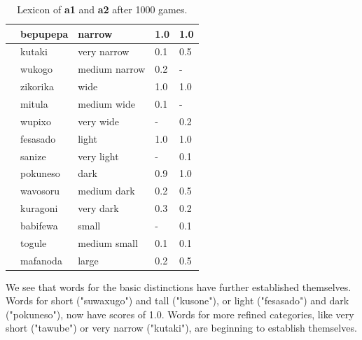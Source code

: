 \begin{table}
\begin{center}
\begin{tabular}{ l  l  l  l  l }
\lsptoprule
[WIDTH 0.0-0.5]&bepupepa&narrow & 1.0&1.0\\ \midrule
 [WIDTH 0.0-0.25]&kutaki&very narrow & 0.1&0.5\\ \midrule
 [WIDTH 0.25-0.5]&wukogo&medium narrow & 0.2&-\\ \midrule
[WIDTH 0.5-1.0]&zikorika&wide & 1.0&1.0\\ \midrule
 [WIDTH 0.5-0.75]&mitula&medium wide &0.1&-\\ \midrule
 [WIDTH 0.75-1.0]&wupixo&very wide & -&0.2\\ \midrule
[GRAY 0.0-0.5]&fesasado&light & 1.0&1.0\\ \midrule
 [GRAY 0.0-0.25]&sanize&very light & -&0.1\\ \midrule
[GRAY 0.5-1.0]&pokuneso&dark &0.9&1.0\\ \midrule
 [GRAY 0.5-0.75]&wavosoru&medium dark & 0.2&0.5\\ \midrule
 [GRAY 0.75-1.0]&kuragoni&very dark &0.3&0.2\\ \midrule
[AREA 0.0-0.5]&babifewa&small & -&0.1\\ \midrule
 [AREA 0.25-0.5]&togule&medium small & 0.1&0.1\\ \midrule
[AREA 0.5-1.0]&mafanoda&large & 0.2&0.5\\ \midrule
\end{tabular}
\caption{\label{tab:lex500b} Lexicon of {\bf a1} and {\bf a2} after 1000 games.}
\end{center}
\end{table}

We see that words for the basic distinctions have further established
themselves. Words for short ("suwaxugo") and tall ("kusone"), or light ("fesasado") and dark 
("pokuneso"), now have scores of 1.0. Words for more refined categories, like very short ("tawube") or 
very narrow ("kutaki"), are beginning to establish themselves.  

